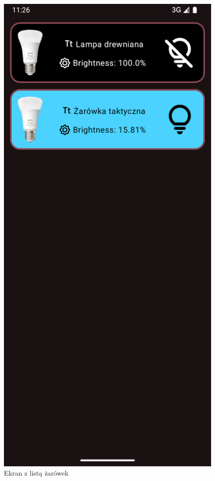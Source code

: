 \documentclass[12pt]{article}
\begin{document}
\begin{figure}[H]
    \centering
    \hypertarget{fig:home-screen}{}
    \includegraphics[scale=0.22]{figures/menu_screen.png}
    \caption{Ekran z listą żarówek}
    \label{fig:home-screen}
\end{figure}
\end{document}

